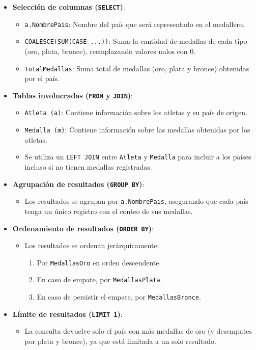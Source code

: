 \begin{itemize}
   \item \textbf{Selección de columnas (\texttt{SELECT})}:
   \begin{itemize}
       \item \texttt{a.NombrePais}: Nombre del país que será representado en el medallero.
       \item \texttt{COALESCE(SUM(CASE ...))}: Suma la cantidad de medallas de cada tipo (oro, plata, bronce), reemplazando valores nulos con 0.
       \item \texttt{TotalMedallas}: Suma total de medallas (oro, plata y bronce) obtenidas por el país.
   \end{itemize}

   \item \textbf{Tablas involucradas (\texttt{FROM} y \texttt{JOIN})}:
   \begin{itemize}
       \item \texttt{Atleta (a)}: Contiene información sobre los atletas y su país de origen.
       \item \texttt{Medalla (m)}: Contiene información sobre las medallas obtenidas por los atletas.
       \item Se utiliza un \texttt{LEFT JOIN} entre \texttt{Atleta} y \texttt{Medalla} para incluir a los países incluso si no tienen medallas registradas.
   \end{itemize}

   \item \textbf{Agrupación de resultados (\texttt{GROUP BY})}:
   \begin{itemize}
       \item Los resultados se agrupan por \texttt{a.NombrePais}, asegurando que cada país tenga un único registro con el conteo de sus medallas.
   \end{itemize}

   \item \textbf{Ordenamiento de resultados (\texttt{ORDER BY})}:
   \begin{itemize}
       \item Los resultados se ordenan jerárquicamente:
       \begin{enumerate}
           \item Por \texttt{MedallasOro} en orden descendente.
           \item En caso de empate, por \texttt{MedallasPlata}.
           \item En caso de persistir el empate, por \texttt{MedallasBronce}.
       \end{enumerate}
   \end{itemize}

   \item \textbf{Límite de resultados (\texttt{LIMIT 1})}:
   \begin{itemize}
       \item La consulta devuelve solo el país con más medallas de oro (y desempates por plata y bronce), ya que está limitada a un solo resultado.
   \end{itemize}
\end{itemize}

